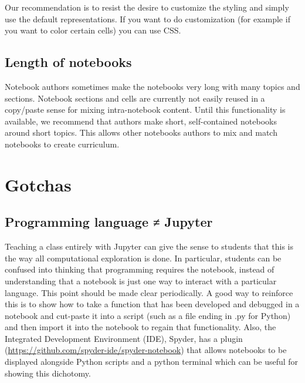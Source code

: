 \documentclass[]{book}
\begin{document}
Our recommendation is to resist the desire to customize the styling and
simply use the default representations. If you want to do customization
(for example if you want to color certain cells) you can use CSS.

\subsection{Length of notebooks}\label{length-of-notebooks}

Notebook authors sometimes make the notebooks very long with many topics
and sections. Notebook sections and cells are currently not easily
reused in a copy/paste sense for mixing intra-notebook content. Until
this functionality is available, we recommend that authors make short,
self-contained notebooks around short topics. This allows other
notebooks authors to mix and match notebooks to create curriculum.

\section{Gotchas}\label{gotchas}

\subsection{Programming language ≠
Jupyter}\label{programming-language-jupyter}

Teaching a class entirely with Jupyter can give the sense to students
that this is the way all computational exploration is done. In
particular, students can be confused into thinking that programming
requires the notebook, instead of understanding that a notebook is just
one way to interact with a particular language. This point should be
made clear periodically. A good way to reinforce this is to show how to
take a function that has been developed and debugged in a notebook and
cut-paste it into a script (such as a file ending in .py for Python) and
then import it into the notebook to regain that functionality. Also, the
Integrated Development Environment (IDE), Spyder, has a plugin
(\url{https://github.com/spyder-ide/spyder-notebook}) that allows
notebooks to be displayed alongside Python scripts and a python terminal
which can be useful for showing this dichotomy.
\end{document}
